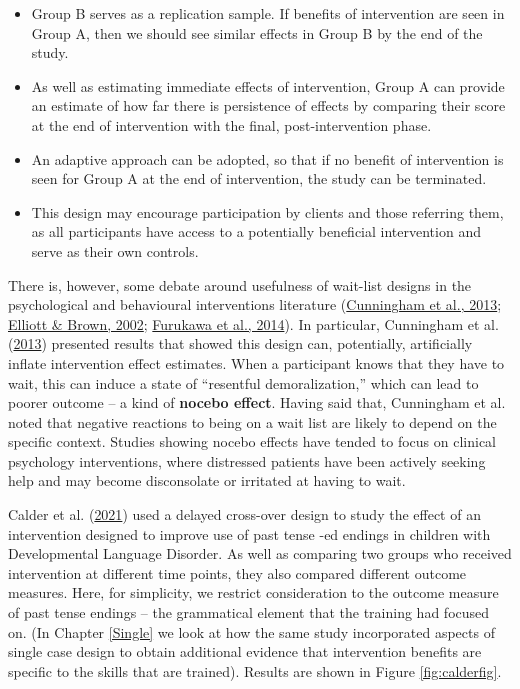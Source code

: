 \documentclass{krantz}
\providecommand{\tightlist}{%
\setlength{\itemsep}{0pt}\setlength{\parskip}{0pt}}
\begin{document}
\begin{itemize}
\tightlist
\item
  Group B serves as a replication sample. If benefits of intervention are seen in Group A, then we should see similar effects in Group B by the end of the study.\\
\item
  As well as estimating immediate effects of intervention, Group A can provide an estimate of how far there is persistence of effects by comparing their score at the end of intervention with the final, post-intervention phase.\\
\item
  An adaptive approach can be adopted, so that if no benefit of intervention is seen for Group A at the end of intervention, the study can be terminated.\\
\item
  This design may encourage participation by clients and those referring them, as all participants have access to a potentially beneficial intervention and serve as their own controls.
\end{itemize}

There is, however, some debate around usefulness of wait-list designs in the psychological and behavioural interventions literature (\protect\hyperlink{ref-cunningham2013}{Cunningham et al., 2013}; \protect\hyperlink{ref-elliott2002}{Elliott \& Brown, 2002}; \protect\hyperlink{ref-furukawa2014}{Furukawa et al., 2014}). In particular, Cunningham et al. (\protect\hyperlink{ref-cunningham2013}{2013}) presented results that showed this design can, potentially, artificially inflate intervention effect estimates. When a participant knows that they have to wait, this can induce a state of ``resentful demoralization,'' which can lead to poorer outcome -- a kind of \textbf{nocebo effect}. Having said that, Cunningham et al. noted that negative reactions to being on a wait list are likely to depend on the specific context. Studies showing nocebo effects have tended to focus on clinical psychology interventions, where distressed patients have been actively seeking help and may become disconsolate or irritated at having to wait.

Calder et al. (\protect\hyperlink{ref-calder2021}{2021}) used a delayed cross-over design to study the effect of an intervention designed to improve use of past tense -ed endings in children with Developmental Language Disorder. As well as comparing two groups who received intervention at different time points, they also compared different outcome measures. Here, for simplicity, we restrict consideration to the outcome measure of past tense endings -- the grammatical element that the training had focused on. (In Chapter \ref{Single} we look at how the same study incorporated aspects of single case design to obtain additional evidence that intervention benefits are specific to the skills that are trained). Results are shown in Figure \ref{fig:calderfig}.
\end{document}
